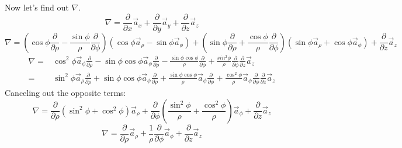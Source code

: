                 Now let's find out $\nabla$.
                $$\nabla = \frac{\partial}{\partial x}\vec{a}_x + 
                    \frac{\partial}{\partial y}\vec{a}_y +
                    \frac{\partial}{\partial z}\vec{a}_z
                $$
                $$
                    \nabla = \left(\cos\phi\frac{\partial}{\partial \rho} - \frac{\sin\phi}{\rho}\frac{\partial}{\partial \phi}\right)\left(\cos\phi\vec{a}_\rho - \sin\phi\vec{a}_\phi\right) +
                    \left(\sin\phi\frac{\partial}{\partial \rho} + \frac{\cos\phi}{\rho}\frac{\partial}{\partial \phi}\right)\left(\sin\phi\vec{a}_\rho + \cos\phi\vec{a}_\phi\right) + \frac{\partial}{\partial z}\vec{a}_z
                $$
                \begin{align*}
                    \nabla = & \cos^2\phi\vec{a}_\phi\frac{\partial}{\partial \rho} - \sin\phi\cos\phi\vec{a}_\phi\frac{\partial}{\partial \rho} - \frac{\sin\phi\cos\phi}{\rho}\frac{\partial}{\partial \phi} + \frac{sin^2\phi}{\rho}\frac{\partial}{\partial \phi} \frac{\partial}{\partial z}\vec{a}_z\\
                    = & \sin^2\phi\vec{a}_\rho\frac{\partial}{\partial \rho} + \sin\phi\cos\phi\vec{a}_\phi\frac{\partial}{\partial \rho} + \frac{\sin\phi\cos\phi}{\rho}\vec{a}_\phi\frac{\partial}{\partial\phi} + \frac{\cos^2\phi}{\rho}\vec{a}_\phi\frac{\partial}{\partial \phi} \frac{\partial}{\partial z}\vec{a}_z
                \end{align*}
                Canceling out the opposite terms:
                $$
                    \nabla = \frac{\partial}{\partial \rho}\left(\sin^2\phi + \cos^2\phi\right)\vec{a}_\rho + \frac{\partial}{\partial \phi}\left(\frac{\sin^2\phi}{\rho} + \frac{\cos^2\phi}{\rho}\right)\vec{a}_\phi + \frac{\partial}{\partial z}\vec{a}_z
                $$
                \begin{equation}
                    \nabla = \frac{\partial}{\partial \rho}\vec{a}_\rho + \frac{1}{\rho}\frac{\partial}{\partial\phi}\vec{a}_\phi + \frac{\partial}{\partial z}\vec{a}_z
                \end{equation}
